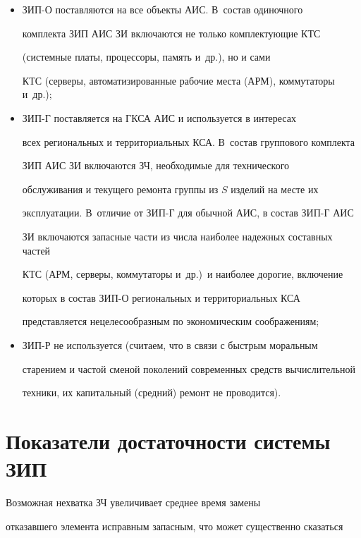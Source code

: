      \begin{itemize}


     \item  ЗИП-О поставляются на все объекты АИС. В~состав одиночного 


комплекта ЗИП АИС ЗИ включаются не только комплектующие КТС 


(системные платы, процессоры, память и~др.), но и сами 


КТС (серверы, автоматизированные рабочие места (АРМ), коммутаторы и~др.);


     \item  ЗИП-Г поставляется на ГКСА АИС и используется в интересах 


всех региональных и территориальных КСА. В~состав группового комплекта 


ЗИП АИС ЗИ включаются ЗЧ, необходимые для технического 


обслуживания и текущего ремонта группы из $S$ изделий на месте их 


эксплуатации. В~отличие от ЗИП-Г для обычной АИС, в состав ЗИП-Г АИС 


ЗИ включаются запасные части из числа наиболее надежных составных частей 


КТС (АРМ, серверы, коммутаторы и~др.)\ и наиболее дорогие, включение 


которых в состав ЗИП-О региональных и территориальных КСА 


представляется нецелесообразным по экономическим соображениям;


     \item ЗИП-Р не используется (считаем, что в связи с быстрым моральным 


старением и частой сменой поколений современных средств вычислительной 


техники, их капитальный (средний) ремонт не проводится).


     \end{itemize}


     


\section{Показатели достаточности системы ЗИП}


     


     Возможная нехватка ЗЧ увеличивает среднее время замены 


отказавшего элемента исправным запасным, что может существенно сказаться 


